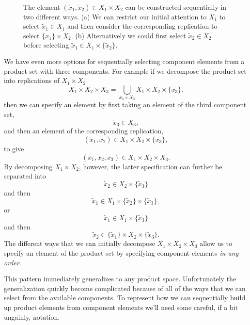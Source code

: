 \documentclass[
  letterpaper,
  DIV=11,
  numbers=noendperiod]{scrartcl}
\begin{document}
\begin{figure}
\begin{minipage}[t]{0.90\linewidth}
{{}

}

\subcaption{\label{fig-sequential-selection21}}
\end{minipage}%
%
\begin{minipage}[t]{0.05\linewidth}

{\centering 

~

}

\end{minipage}%

\caption{\label{fig-sequential-selection}The element
\((\tilde{x}_{1}, \tilde{x}_{2}) \in X_{1} \times X_{2}\) can be
constructed sequentially in two different ways. (a) We can restrict our
initial attention to \(X_{1}\) to select \(\tilde{x}_{1} \in X_{1}\) and
then consider the corresponding replication to select
\(\{ x_{1} \} \times X_{2}\). (b) Alternatively we could first select
\(\tilde{x}_{2} \in X_{2}\) before selecting
\(\tilde{x}_{1} \in X_{1} \times \{ \tilde{x}_{2} \}\).}

\end{figure}

We have even more options for sequentially selecting component elements
from a product set with three components. For example if we decompose
the product set into replications of \(X_{1} \times X_{2}\) \[
X_{1} \times X_{2} \times X_{3}
=
\bigcup_{ x_{3} \times X_{3} } X_{1} \times X_{2} \times \{ x_{3} \}.
\] then we can specify an element by first taking an element of the
third component set, \[
\tilde{x}_{3} \in X_{3},
\] and then an element of the corresponding replication, \[
(\tilde{x}_{1}, \tilde{x}_{2}) \in X_{1} \times X_{2} \times \{ x_{3} \},
\] to give \[
(\tilde{x}_{1}, \tilde{x}_{2}, \tilde{x}_{3}) \in X_{1} \times X_{2} \times X_{3}.
\] By decomposing \(X_{1} \times X_{2}\), however, the latter
specification can further be separated into \[
\tilde{x}_{2} \in X_{2} \times \{ \tilde{x}_{3} \}
\] and then \[
\tilde{x}_{1} \in X_{1} \times \{ \tilde{x}_{2} \} \times \{ \tilde{x}_{3} \},
\] or \[
\tilde{x}_{1} \in X_{1} \times \{ \tilde{x}_{3} \}
\] and then \[
\tilde{x}_{2} \in \{ \tilde{x}_{1} \} \times X_{2} \times \{ \tilde{x}_{3} \}.
\] The different ways that we can initially decompose
\(X_{1} \times X_{2} \times X_{3}\) allow us to specify an element of
the product set by specifying component elements \emph{in any order}.

This pattern immediately generalizes to any product space. Unfortunately
the generalization quickly become complicated because of all of the ways
that we can select from the available components. To represent how we
can sequentially build up product elements from component elements we'll
need some careful, if a bit ungainly, notation.
\end{document}
